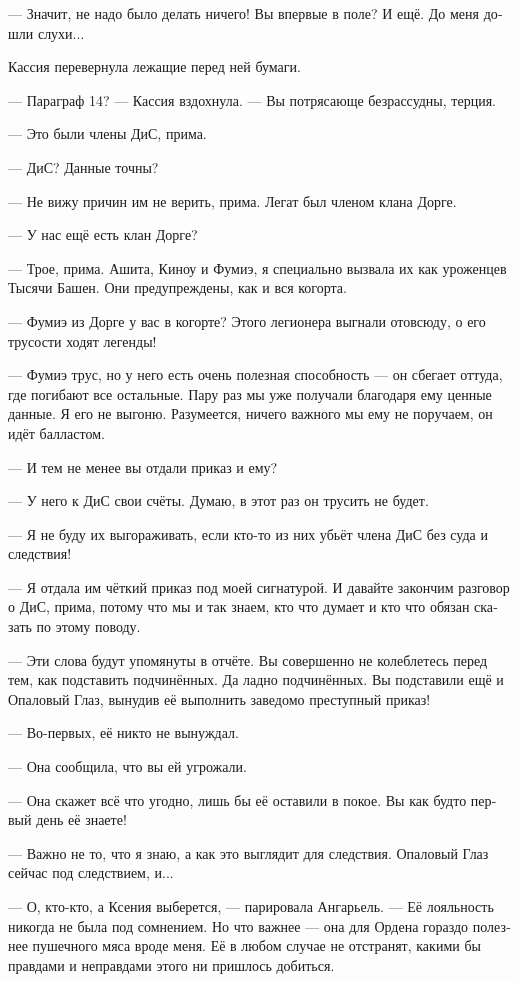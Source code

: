 \documentclass[a4paper,12pt,fleqn]{book}\usepackage{cooltooltips}\usepackage{polyglossia}\setdefaultlanguage[babelshorthands=true]{russian}\setotherlanguage{english}\defaultfontfeatures{Ligatures=TeX,Mapping=tex-text} \usepackage{xcolor}\definecolor{lightgray}{HTML}{bbbbbb}\color{lightgray}\newcommand{\ml}[3]{\textenglish{\textcolor{black}{#3}}}
\begin{document}
--- Значит, не надо было делать ничего!
Вы впервые в поле?
И ещё.
До меня дошли слухи...

Кассия перевернула лежащие перед ней бумаги.

--- Параграф 14? --- Кассия вздохнула.
--- Вы потрясающе безрассудны, терция.

--- Это были члены ДиС, прима.

--- ДиС?
Данные точны?

--- Не вижу причин им не верить, прима.
Легат был членом клана Дорге.

--- У нас ещё есть клан Дорге?

--- Трое, прима.
Ашита, Киноу и Фумиэ, я специально вызвала их как уроженцев Тысячи Башен.
Они предупреждены, как и вся когорта.

--- Фумиэ из Дорге у вас в когорте?
Этого легионера выгнали отовсюду, о его трусости ходят легенды!

--- Фумиэ трус, но у него есть очень полезная способность --- он сбегает оттуда, где погибают все остальные.
Пару раз мы уже получали благодаря ему ценные данные.
Я его не выгоню.
Разумеется, ничего важного мы ему не поручаем, он идёт балластом.

--- И тем не менее вы отдали приказ и ему?

--- У него к ДиС свои счёты.
Думаю, в этот раз он трусить не будет.

--- Я не буду их выгораживать, если кто-то из них убьёт члена ДиС без суда и следствия!

--- Я отдала им чёткий приказ под моей сигнатурой.
И давайте закончим разговор о ДиС, прима, потому что мы и так знаем, кто что думает и кто что обязан сказать по этому поводу.

--- Эти слова будут упомянуты в отчёте.
Вы совершенно не колеблетесь перед тем, как подставить подчинённых.
Да ладно подчинённых.
Вы подставили ещё и Опаловый Глаз, вынудив её выполнить заведомо преступный приказ!

--- Во-первых, её никто не вынуждал.

--- Она сообщила, что вы ей угрожали.

--- Она скажет всё что угодно, лишь бы её оставили в покое.
Вы как будто первый день её знаете!

--- Важно не то, что я знаю, а как это выглядит для следствия.
Опаловый Глаз сейчас под следствием, и...

--- О, кто-кто, а Ксения выберется, --- парировала Ангарьель.
--- Её лояльность никогда не была под сомнением.
Но что важнее --- она для Ордена гораздо полезнее пушечного мяса вроде меня.
Её в любом случае не отстранят, какими бы правдами и неправдами этого ни пришлось добиться.
\end{document}
